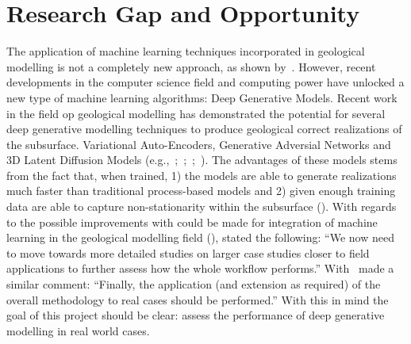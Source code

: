 \section{Research Gap and Opportunity}
The application of machine learning techniques incorporated in geological modelling is not a completely new approach, as shown by~\cite{demyanov2008geomodelling}. However, recent developments in the computer science field and computing power have unlocked a new type of machine learning algorithms: Deep Generative Models. Recent work in the field op geological modelling has demonstrated the potential for several deep generative modelling techniques to produce geological correct realizations of the subsurface. Variational Auto-Encoders, Generative Adversial Networks and 3D Latent Diffusion Models (e.g.,~\cite{laloy2017inversion};~\cite{bhavsar2024stable};~\cite{song2023gansim};~\cite{federico2025three}). 
The advantages of these models stems from the fact that, when trained, 1) the models are able to generate realizations much faster than traditional process-based models and 2) given enough training data are able to capture non-stationarity within the subsurface (\cite{rongier2025atowards}). %
With regards to the possible improvements with could be made for integration of machine learning in the geological modelling field (\cite{rongier2025atowards}), stated the following: 
“We now need to move towards more detailed studies on larger case studies closer to field applications to further assess how the whole workflow performs.” 
With~\cite{federico2025three} made a similar comment: “Finally, the application (and extension as required) of the overall methodology to real cases should be performed.” 
With this in mind the goal of this project should be clear: assess the performance of deep generative modelling in real world cases. 
